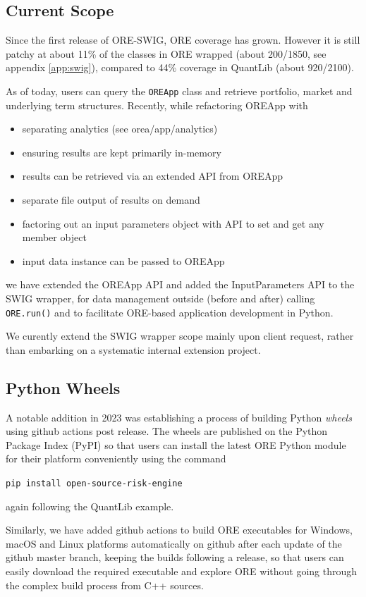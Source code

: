 \documentclass[12pt, a4paper]{report}
\begin{document}
\subsection*{Current Scope}

Since the first release of ORE-SWIG, ORE coverage has grown. However it is still patchy  
at about 11\% of the classes in ORE wrapped (about 200/1850, see appendix \ref{app:swig}),
compared to 44\% coverage in QuantLib (about 920/2100). 

As of today, users can query the {\tt OREApp} class and retrieve portfolio, market and underlying
term structures. Recently, while refactoring OREApp with
\begin{itemize}
\item separating analytics (see orea/app/analytics) 
\item ensuring results are kept primarily in-memory
\item results can be retrieved via an extended API from OREApp
\item separate file output of results on demand 
\item factoring out an input parameters object with API to set and get any member object
\item input data instance can be passed to OREApp
\end{itemize}
we have extended the OREApp API and added the InputParameters API to the SWIG wrapper,
for data management outside (before and after) calling {\tt ORE.run()} and to facilitate
ORE-based application development in Python.

We curently extend the SWIG wrapper scope mainly upon client request, rather than embarking
on a systematic internal extension project. 

\subsection*{Python Wheels}

A notable addition in 2023 was establishing a process of building Python {\em wheels} using github
actions post release. The wheels are published on the Python Package Index (PyPI) so that users can
install the latest ORE Python module for their platform conveniently using the command

\centerline{\tt pip install open-source-risk-engine}

again following the QuantLib example.

Similarly, we have added github actions to build ORE executables for Windows, macOS and
Linux platforms automatically on github after each update of the github master branch, keeping
the builds following a release, so that users can easily download the required executable and
explore ORE without going through the complex build process from C++ sources.
\end{document}
